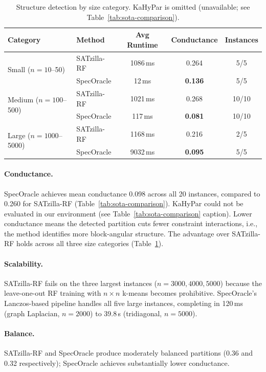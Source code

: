 \documentclass[11pt]{article}
\begin{document}
\begin{table}[h]
\centering
\caption{Structure detection by size category. KaHyPar is omitted (unavailable; see Table~\ref{tab:sota-comparison}).}
\label{tab:sota-bysize}
\begin{tabular}{llccc}
\toprule
\textbf{Category} & \textbf{Method} & \textbf{Avg Runtime} & \textbf{Conductance} & \textbf{Instances} \\
\midrule
\multirow{2}{*}{Small ($n\!=\!10$--50)}
  & SATzilla-RF & 1086\,ms & 0.264 & 5/5 \\
  & SpecOracle  &  12\,ms   & \textbf{0.136} & 5/5 \\
\midrule
\multirow{2}{*}{Medium ($n\!=\!100$--500)}
  & SATzilla-RF & 1021\,ms & 0.268 & 10/10 \\
  & SpecOracle  & 117\,ms  & \textbf{0.081} & 10/10 \\
\midrule
\multirow{2}{*}{Large ($n\!=\!1000$--5000)}
  & SATzilla-RF & 1168\,ms & 0.216 & 2/5 \\
  & SpecOracle  & 9032\,ms & \textbf{0.095} & 5/5 \\
\bottomrule
\end{tabular}
\end{table}

\paragraph{Conductance.} SpecOracle achieves mean conductance 0.098 across all 20 instances, compared to 0.260 for SATzilla-RF (Table~\ref{tab:sota-comparison}). KaHyPar could not be evaluated in our environment (see Table~\ref{tab:sota-comparison} caption). Lower conductance means the detected partition cuts fewer constraint interactions, i.e., the method identifies more block-angular structure. The advantage over SATzilla-RF holds across all three size categories (Table~\ref{tab:sota-bysize}).

\paragraph{Scalability.} SATzilla-RF fails on the three largest instances ($n = 3000, 4000, 5000$) because the leave-one-out RF training with $n \times n$ k-means becomes prohibitive. SpecOracle's Lanczos-based pipeline handles all five large instances, completing in 120\,ms (graph Laplacian, $n=2000$) to 39.8\,s (tridiagonal, $n=5000$).

\paragraph{Balance.} SATzilla-RF and SpecOracle produce moderately balanced partitions (0.36 and 0.32 respectively); SpecOracle achieves substantially lower conductance.
\end{document}
